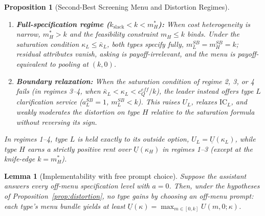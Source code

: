 \documentclass[11pt]{article}
\newtheorem{proposition}{Proposition}
\newtheorem{lemma}{Lemma}
\begin{document}
\begin{proposition}[Second-Best Screening Menu and Distortion Regimes]
\begin{enumerate}[leftmargin=*]
\[\]
The asking distortion is therefore bounded by the relative bias: $0 < 1 - a_H^{SB} < \tilde\rho/s$. It intensifies as $\kappa_L$ increases toward $\bar\kappa_L$. At $m_L = k$, zero residual attributes remain ($k - m_L = 0$), so $a_L$ is payoff-irrelevant to both parties.
\item \textbf{Full-specification regime ($k_{\text{slack}} < k < m_H^*$):} When cost heterogeneity is narrow, $m_H^* > k$ and the feasibility constraint $m_H \le k$ binds. Under the saturation condition $\kappa_L \le \bar\kappa_L$, both types specify fully, $m_L^{SB} = m_H^{SB} = k$; residual attributes vanish, asking is payoff-irrelevant, and the menu is payoff-equivalent to pooling at $(k, 0)$.
\item \textbf{Boundary relaxation:} When the saturation condition of regime 2, 3, or 4 fails (in regimes 3--4, when $\bar\kappa_L < \kappa_L < c_Q^{eff}/k$), the leader instead offers type $L$ clarification service ($a_L^{SB} = 1$, $m_L^{SB} < k$). This raises $U_L$, relaxes $\text{IC}_L$, and weakly moderates the distortion on type $H$ relative to the saturation formula without reversing its sign.
\end{enumerate}
In regimes 1--4, type $L$ is held exactly to its outside option, $U_L = \underline{U}(\kappa_L)$, while type $H$ earns a strictly positive rent over $\underline{U}(\kappa_H)$ in regimes 1--3 (except at the knife-edge $k = m_H^*$).
\end{proposition}

\begin{lemma}[Implementability with free prompt choice]
\label{lem:implementable}
Suppose the assistant answers every off-menu specification level with $a = 0$. Then, under the hypotheses of Proposition~\ref{prop:distortion}, no type gains by choosing an off-menu prompt: each type's menu bundle yields at least $\underline{U}(\kappa) = \max_{m\in[0,k]} U(m,0;\kappa)$.
\end{lemma}
\end{document}
